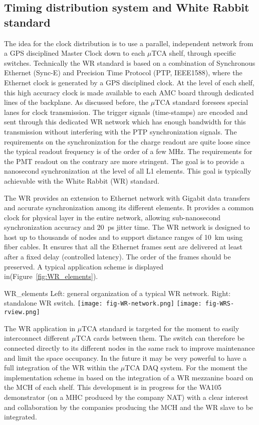 \subsection{Timing distribution system and White Rabbit standard}

The idea for the clock distribution is to use a parallel, independent network from a GPS disciplined Master Clock down to each $\mu$TCA
shelf, through specific switches. Technically the WR standard is based on a combination of Synchronous Ethernet (Sync-E) and Precision Time
Protocol (PTP, IEEE1588), where the Ethernet clock is generated by a GPS disciplined clock. At the level of each shelf, this high accuracy
clock is made available to each AMC board through dedicated lines of the backplane. As discussed before, the $\mu$TCA standard foresees
special lanes for clock transmission. The trigger signals (time-stamps) are encoded and sent through this dedicated WR network
which has enough bandwidth for this transmission without interfering with the PTP synchronization signals. The requirements on the
synchronization for the charge readout are quite loose since the typical readout frequency is of the order of a few MHz. The
requirements for the PMT readout on the contrary are more stringent. The goal is to provide a nanosecond synchronization at the
level of all L1 elements. This goal is typically achievable with the White Rabbit (WR) standard\cite{WR-standard}.

The WR provides an extension to Ethernet network with Gigabit data transfers and accurate synchronization among its different
elements. It provides a common clock for physical layer in the entire network, allowing sub-nanosecond synchronization accuracy and 20~ps
jitter time. The WR network is designed to host up to thousands of nodes and to support distance ranges of 10~km using fiber cables. It
ensures that all the Ethernet frames sent are delivered at least after a fixed delay (controlled latency). The order of the frames should be
preserved.  A typical application scheme is displayed in(Figure~\ref{fig:WR_elements}).

\begin{cdrfigure}{WR_elements}
{\small Left: general organization of a typical WR network. Right: standalone WR switch.}
\texttt{[image: fig-WR-network.png]}
\texttt{[image: fig-WRS-rview.png]}
\end{cdrfigure}

The WR application in $\mu$TCA standard is targeted for the moment to easily interconnect different $\mu$TCA cards between them. The switch
can therefore be connected directly to its different nodes in the same rack to improve maintenance and limit the space occupancy. In the
future it may be very powerful to have a full integration of the WR within the $\mu$TCA DAQ system. For the moment the implementation
scheme in based on the integration of a WR mezzanine board on the MCH of each shelf. This development is in progress for the WA105
demonstrator (on a MHC produced by the company NAT) with a clear interest and collaboration by the companies producing the MCH and the
WR slave to be integrated.
